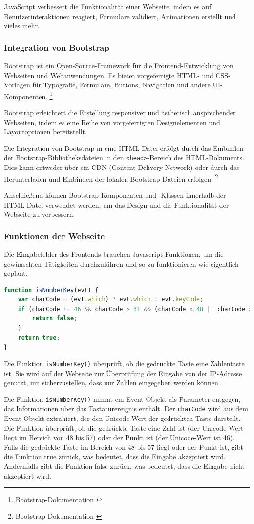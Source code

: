 JavaScript verbessert die Funktionalität einer Webseite, indem es auf Benutzerinteraktionen reagiert, Formulare validiert, Animationen erstellt und vieles mehr.

\subsubsection*{Integration von Bootstrap}
Bootstrap ist ein Open-Source-Framework für die Frontend-Entwicklung von Webseiten und Webanwendungen. Es bietet vorgefertigte HTML- und CSS-Vorlagen für Typografie, Formulare, Buttons, Navigation und andere UI-Komponenten. \footnote{Bootstrap-Dokumentation \cite{Bootstrap}}

Bootstrap erleichtert die Erstellung responsiver und ästhetisch ansprechender Webseiten, indem es eine Reihe von vorgefertigten Designelementen und Layoutoptionen bereitstellt.

Die Integration von Bootstrap in eine HTML-Datei erfolgt durch das Einbinden der Bootstrap-Bibliotheksdateien in den \texttt{<head>}-Bereich des HTML-Dokuments. Dies kann entweder über ein CDN (Content Delivery Network) oder durch das Herunterladen und Einbinden der lokalen Bootstrap-Dateien erfolgen. \footnote{Bootstrap Dokumentation \cite{CDN-Links}}

Anschließend können Bootstrap-Komponenten und -Klassen innerhalb der HTML-Datei verwendet werden, um das Design und die Funktionalität der Webseite zu verbessern.

\subsubsection{Funktionen der Webseite}
Die Eingabefelder des Frontends brauchen Javascript Funktionen, um die gewünschten Tätigkeiten durchzuführen und so zu funktionieren wie eigentlich geplant.
\begin{lstlisting}[language=JavaScript, caption={Javascript | Ueberpruefung, ob die Eingabe eine Zahl oder . ist}]
function isNumberKey(evt) {
    var charCode = (evt.which) ? evt.which : evt.keyCode;
    if (charCode != 46 && charCode > 31 && (charCode < 48 || charCode > 57)) {
        return false;
    }
    return true;
}
\end{lstlisting}
Die Funktion \texttt{isNumberKey()} überprüft, ob die gedrückte Taste eine Zahlentaste ist. Sie wird auf der Webseite zur Überprüfung der Eingabe von der IP-Adresse genutzt, um sicherzustellen, dass nur Zahlen eingegeben werden können.

Die Funktion \texttt{isNumberKey()} nimmt ein Event-Objekt als Parameter entgegen, das Informationen über das Tastaturereignis enthält. Der \texttt{charCode} wird aus dem Event-Objekt extrahiert, der den Unicode-Wert der gedrückten Taste darstellt. Die Funktion überprüft, ob die gedrückte Taste eine Zahl ist (der Unicode-Wert liegt im Bereich von 48 bis 57) oder der Punkt ist (der Unicode-Wert ist 46). Falls die gedrückte Taste im Bereich von 48 bis 57 liegt oder der Punkt ist, gibt die Funktion true zurück, was bedeutet, dass die Eingabe akzeptiert wird. Andernfalls gibt die Funktion false zurück, was bedeutet, dass die Eingabe nicht akzeptiert wird.

